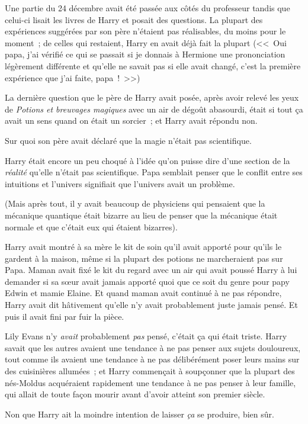 Une partie du 24 décembre avait été passée aux côtés du professeur tandis que celui-ci lisait les livres de Harry et posait des questions. La plupart des expériences suggérées par son père n'étaient pas réalisables, du moins pour le moment~; de celles qui restaient, Harry en avait déjà fait la plupart (<<~Oui papa, j'ai vérifié ce qui se passait si je donnais à Hermione une prononciation légèrement différente et qu'elle ne savait pas si elle avait changé, c'est la première expérience que j'ai faite, papa~!~>>)

La dernière question que le père de Harry avait posée, après avoir relevé les yeux de \emph{Potions et breuvages magiques} avec un air de dégoût abasourdi, était si tout ça avait un sens quand on était un sorcier~; et Harry avait répondu non.

Sur quoi son père avait déclaré que la magie n'était pas scientifique.

Harry était encore un peu choqué à l'idée qu'on puisse dire d'une section de la \emph{réalité} qu'elle n'était pas scientifique. Papa semblait penser que le conflit entre ses intuitions et l'univers signifiait que l'univers avait un problème.

(Mais après tout, il y avait beaucoup de physiciens qui pensaient que la mécanique quantique était bizarre au lieu de penser que la mécanique était normale et que c'était eux qui étaient bizarres).

Harry avait montré à sa mère le kit de soin qu'il avait apporté pour qu'ils le gardent à la maison, même si la plupart des potions ne marcheraient pas sur Papa. Maman avait fixé le kit du regard avec un air qui avait poussé Harry à lui demander si sa sœur avait jamais apporté quoi que ce soit du genre pour papy Edwin et mamie Elaine. Et quand maman avait continué à ne pas répondre, Harry avait dit hâtivement qu'elle n'y avait probablement juste jamais pensé. Et puis il avait fini par fuir la pièce.

Lily Evans n'y \emph{avait} probablement \emph{pas} pensé, c'était ça qui était triste. Harry savait que les autres avaient une tendance à ne pas penser aux sujets douloureux, tout comme ils avaient une tendance à ne pas délibérément poser leurs mains sur des cuisinières allumées~; et Harry commençait à soupçonner que la plupart des nés-Moldus acquéraient rapidement une tendance à ne pas penser à leur famille, qui allait de toute façon mourir avant d'avoir atteint son premier siècle.

Non que Harry ait la moindre intention de laisser \emph{ça} se produire, bien sûr.

